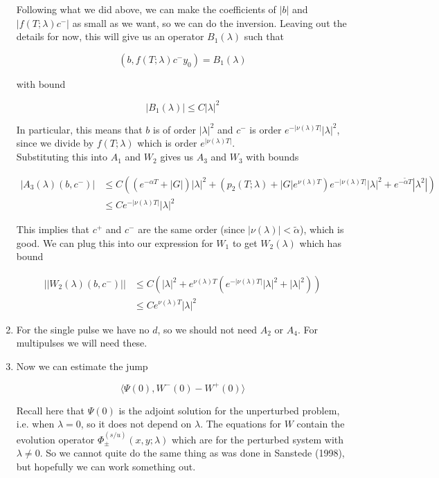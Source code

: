 \documentclass[12pt]{article}
\begin{document}
\begin{enumerate}
Following what we did above, we can make the coefficients of $|b|$ and $|f(T; \lambda) c^-|$ as small as we want, so we can do the inversion. Leaving out the details for now, this will give us an operator $B_1(\lambda)$ such that

\[
(b, f(T; \lambda) c^- y_0) = B_1(\lambda)
\]

with bound

\[
|B_1(\lambda)| \leq C|\lambda|^2
\]

In particular, this means that $b$ is of order $|\lambda|^2$ and $c^-$ is order $e^{-|\nu(\lambda)T|} |\lambda|^2$, since we divide by $f(T; \lambda)$ which is order $e^{|\nu(\lambda)T|}$.\\

Substituting this into $A_1$ and $W_2$ gives us $A_3$ and $W_3$ with bounds

\begin{align*}
|A_3(\lambda)(b, c^-)| &\leq C ( (e^{-\alpha T} + |G|)|\lambda|^2 + ( p_2(T; \lambda) + |G|e^{\nu(\lambda)T})e^{-|\nu(\lambda)T|} |\lambda|^2 + e^{-\tilde{\alpha}T}  |\lambda^2|) \\
&\leq C e^{-|\nu(\lambda)T|} |\lambda|^2
\end{align*}

This implies that $c^+$ and $c^-$ are the same order (since $|\nu(\lambda)| < \tilde{\alpha}$), which is good. We can plug this into our expression for $W_1$ to get $W_2(\lambda)$ which has bound

\begin{align*}
||W_2(\lambda)(b,c^-)|| &\leq C (|\lambda|^2 + e^{\nu(\lambda)T}(e^{-|\nu(\lambda)T|} |\lambda|^2 + |\lambda|^2)) \\
&\leq C e^{\nu(\lambda)T} |\lambda|^2
\end{align*}

\item For the single pulse we have no $d$, so we should not need $A_2$ or $A_4$. For multipulses we will need these.

\item Now we can estimate the jump

\[
\langle \Psi(0), W^-(0) - W^+(0) \rangle 
\]

Recall here that $\Psi(0)$ is the adjoint solution for the unperturbed problem, i.e. when $\lambda = 0$, so it does not depend on $\lambda$. The equations for $W$ contain the evolution operator $\Phi^{(s/u)}_\pm(x, y; \lambda)$ which are for the perturbed system with $\lambda \neq 0$. So we cannot quite do the same thing as was done in Sanstede (1998), but hopefully we can work something out.\\


\end{enumerate}
\end{document}
